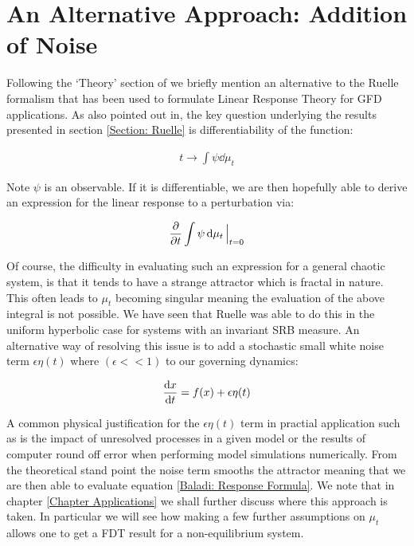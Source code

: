 \section{An Alternative Approach: Addition of Noise} \label{Ruelle Alternatives}

Following the `Theory' section of \cite{Gritsun2007} we briefly mention an alternative to the Ruelle formalism that has been used to formulate Linear Response Theory for GFD applications. As also pointed out in\cite{Baladi2014}, the key question underlying the results presented in section \ref{Section: Ruelle} is differentiability of the function: 

\begin{align}
t \to \int \psi \dd{\mu_t}
\end{align}

\noindent Note $\psi$ is an observable. If it is differentiable, we are then hopefully able to derive an expression for the linear response to a perturbation via:

\begin{align} \label{Baladi: Response Formula}
\pdv{t} \int \psi \dd{\mu_t} \Big|_{t=0} 
\end{align}

\noindent Of course, the difficulty in evaluating such an expression for a general chaotic system, is that it tends to have a strange attractor which is fractal in nature. This often leads to $\mu_t$ becoming singular meaning the evaluation of the above integral is not possible. We have seen that Ruelle was able to do this in the uniform hyperbolic case for systems with an invariant SRB measure. An alternative way of resolving this issue is to add a stochastic small white noise term $\epsilon \eta(t)$ where $(\epsilon << 1)$ to our governing dynamics:

\begin{align}
\dv{x}{t} = f(x) + \epsilon \eta(t) \label{Noise dynamics}
\end{align}

\noindent A common physical justification for the $\epsilon \eta(t)$ term in practial application such as \cite{Gritsun2007} is the impact of unresolved processes in a given model or the results of computer round off error when performing model simulations numerically. From the theoretical stand point the noise term smooths the attractor meaning that we are then able to evaluate equation \ref{Baladi: Response Formula}. We note that in chapter \ref{Chapter Applications} we shall further discuss \cite{Gritsun2007} where this approach is taken. In particular we will see how making a few further assumptions on $\mu_t$ allows one to get a FDT result for a non-equilibrium system.